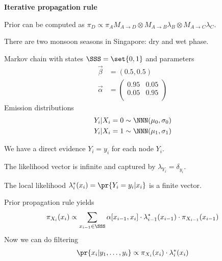 \documentclass[landscape,footrule]{foils}
\begin{document}
\textbf{Iterative propagation rule}
\begin{triangles}
\item Prior can be computed as $\pi_D\propto \pi_AM_{A\to D} \otimes M_{A\to B}\lambda_B\otimes M_{A\to C}\lambda_C$\enspace.
\end{triangles}



There are two monsoon seasons in Singapore: dry and wet phase.

\enlargethispage{1cm}
Markov chain with states $\SSS=\set{0,1}$ and parameters
\begin{align*}
\vec{\beta}&=(0.5, 0.5)\\
\vec{\alpha}&=
\begin{pmatrix}
0.95 & 0.05\\
0.05 & 0.95\\
\end{pmatrix}
\end{align*}
Emission distributions
\begin{align*}
Y_i|X_i=0\sim\NNN(\mu_0,\sigma_0)\\
Y_i|X_i=1\sim\NNN(\mu_1,\sigma_1)\\
\end{align*}


\begin{triangles}
\item We have a direct evidence $Y_i=y_i$ for each node $Y_i$. 
\item The likelihood vector is infinite and captured by $\lambda_{Y_i}=\delta_{y_i}$.
\item The local likelihood $\lambda_i^*(x_i)=\pr{Y_i=y_i|x_i}$ is a finite vector. 
\end{triangles}


\enlargethispage{1cm}

\vspace*{-1.0cm}

Prior propagation rule yields
\begin{align*}
\pi_{X_i}(x_i)\propto \sum_{x_{i-1}\in \SSS} \alpha[x_{i-1}, x_i]\cdot\lambda_{i-1}^*(x_{i-1})\cdot \pi_{X_{i-1}}(x_{i-1})
\end{align*}
Now we can do filtering 
\begin{align*}
\pr{x_i|y_1,\ldots,y_{i}}\propto \pi_{X_i}(x_i)\cdot\lambda_i^*(x_i)
\end{align*}
\end{document}
